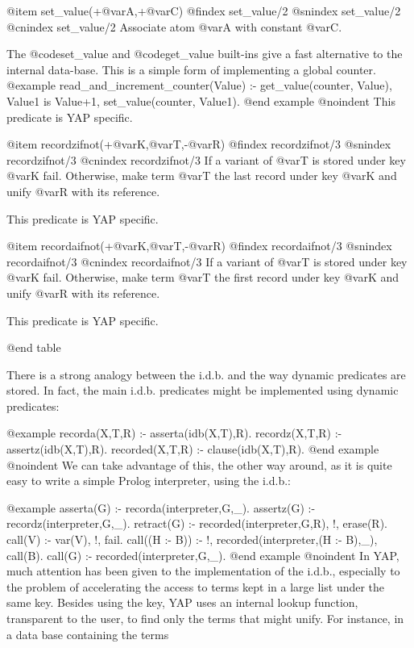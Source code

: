 {{{{{{@item set_value(+@var{A},+@var{C})
@findex set_value/2 
@snindex set_value/2 
@cnindex set_value/2 
Associate atom @var{A} with constant @var{C}.

The @code{set_value} and @code{get_value} built-ins give a fast alternative to
the internal data-base. This is a simple form of implementing a global
counter.
@example
       read_and_increment_counter(Value) :-
                get_value(counter, Value),
                Value1 is Value+1,
                set_value(counter, Value1).
@end example
@noindent
This predicate is YAP specific.

@item recordzifnot(+@var{K},@var{T},-@var{R})
@findex recordzifnot/3
@snindex recordzifnot/3
@cnindex recordzifnot/3
If a variant of @var{T} is stored under key @var{K} fail. Otherwise, make
term @var{T} the last record under key @var{K} and unify @var{R} with its
reference.

This predicate is YAP specific.

@item recordaifnot(+@var{K},@var{T},-@var{R})
@findex recordaifnot/3
@snindex recordaifnot/3
@cnindex recordaifnot/3
If a variant of @var{T} is stored under key @var{K} fail. Otherwise, make
term @var{T} the first record under key @var{K} and unify @var{R} with its
reference.

This predicate is YAP specific.

@end table

There is a strong analogy between the i.d.b. and the way dynamic 
predicates are stored. In fact, the main i.d.b. predicates might be 
implemented using dynamic predicates:

@example
recorda(X,T,R) :- asserta(idb(X,T),R).
recordz(X,T,R) :- assertz(idb(X,T),R).
recorded(X,T,R) :- clause(idb(X,T),R).
@end example
@noindent
 We can take advantage of this, the other way around, as it is quite 
easy to write a simple Prolog interpreter, using the i.d.b.:

@example
asserta(G) :- recorda(interpreter,G,_).
assertz(G) :- recordz(interpreter,G,_).
retract(G) :- recorded(interpreter,G,R), !, erase(R).
call(V) :- var(V), !, fail.
call((H :- B)) :- !, recorded(interpreter,(H :- B),_), call(B).
call(G) :- recorded(interpreter,G,_).
@end example
@noindent
In YAP, much attention has been given to the implementation of the 
i.d.b., especially to the problem of accelerating the access to terms kept in 
a large list under the same key. Besides using the key, YAP uses an internal 
lookup function, transparent to the user, to find only the terms that might 
unify. For instance, in a data base containing the terms

}}}}}}
